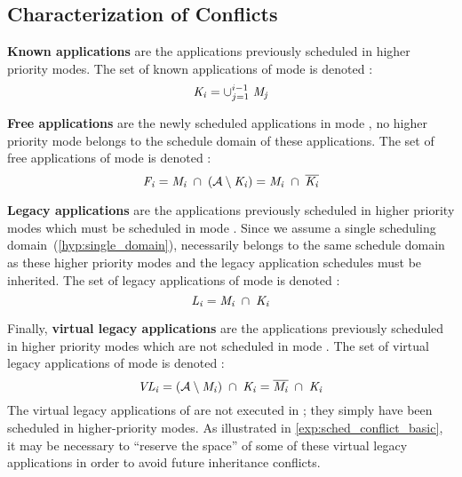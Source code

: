\subsection{Characterization of Conflicts}
\label{subsec:conflict_def}

\squarepar{%
	As illustrated in \cref{exp:sched_conflict_basic}, the continuity constraint may lead to conflicts, leading to the failure of the multi-mode schedule synthesis problem, while a solution could exist.
	In particular, if a given mode \mode{} belongs to the schedule domains of two different applications which have been independently scheduled in higher priority modes, there is a risk of conflict, \ie the two inherited schedules may be non-compatible.
	This section formalizes the notions of (virtual) legacies and conflicting modes.
	$\overline{X}$ denotes the complement of $X$; \ie $\overline{X} = \appset \setminus X$.
	For each mode \modei, we define four sets of applications.%
}

\textbf{Known applications} are the applications previously scheduled in higher priority modes. The set of known applications of mode \modei is denoted \knownAppi:
	\begin{equation}
	\mathit{K_{i}} = \cup_{j = 1}^{i-1} \; \mathit{M_{j}}
	\end{equation}

\textbf{Free applications} are the newly scheduled applications in mode \modei, \ie no higher priority mode belongs to the schedule domain of these applications.
	The set of free applications of mode \modei is denoted \freeAppi :
	\begin{equation}
	\mathit{F_{i}} = \mathit{M_{i}} \; \cap \; (\mathcal{A} \setminus \mathit{K_{i}}) = \mathit{M_{i}} \; \cap \; \overline{\mathit{K_{i}}}
	\end{equation}

\textbf{Legacy applications} are the applications previously scheduled in higher priority modes which must be scheduled in mode \modei.
	Since we assume a single scheduling domain~(\cref{hyp:single_domain}), \modei necessarily belongs to the same schedule domain as these higher priority modes and the legacy application schedules must be inherited.
	The set of legacy applications of mode \modei is denoted \legAppi:
	\begin{equation}
	\mathit{L_{i}} = \mathit{M_{i}} \; \cap \; {\mathit{K_{i}}}
	\end{equation}

Finally, \textbf{virtual legacy applications} are the applications previously scheduled in higher priority modes which are not scheduled in mode \modei.
	The set of virtual legacy applications of mode \modei is denoted \virtlegAppi:
	\begin{equation}
	\mathit{VL_{i}} = (\mathcal{A} \setminus \mathit{M_{i}})\; \cap \; {\mathit{K_{i}}} = \overline{\mathit{M_{i}}} \; \cap \; {\mathit{K_{i}}}
	\end{equation}
The virtual legacy applications of \modei are not executed in \modei; they simply have been scheduled in higher-priority modes. As illustrated in \cref{exp:sched_conflict_basic}, it may be necessary to ``reserve the space'' of some of these virtual legacy applications in order to avoid future inheritance conflicts.


